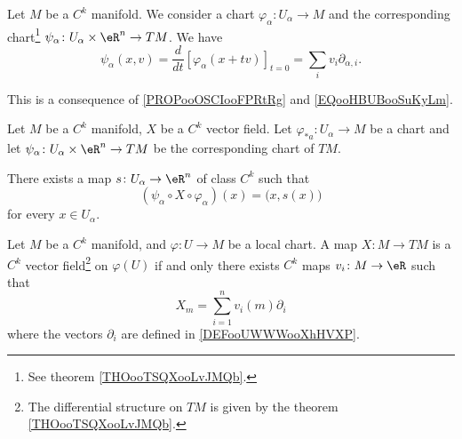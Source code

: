 \begin{proposition}	\label{PROPooMDSQooZxwwTd}
	Let \( M\) be a \( C^k\) manifold. We consider a chart \(\varphi_{\alpha} \colon U_{\alpha}\to M  \) and the corresponding chart\footnote{See theorem \ref{THOooTSQXooLvJMQb}.} \(\psi_{\alpha} \colon U_{\alpha}\times \eR^n\to TM  \). We have
	\begin{equation}
		\psi_{\alpha}(x,v)=\frac{d}{dt} \left[ \varphi_{\alpha}(x+tv)  \right]_{t=0}=\sum_iv_i\partial_{\alpha,i}.
	\end{equation}
\end{proposition}
This is a consequence of \ref{PROPooOSCIooFPRtRg} and \eqref{EQooHBUBooSuKyLm}.


\begin{proposition}	\label{PROPooZXFMooEYpudy}
	Let \( M\) be a \( C^k\) manifold, \( X\) be a \( C^k\) vector field. Let \(\varphi_{*a} \colon U_{\alpha}\to M  \) be a chart and let \(\psi_{\alpha} \colon U_{\alpha}\times \eR^n\to TM  \) be the corresponding chart of \( TM\).

	There exists a map \(s \colon U_{\alpha}\to \eR^n  \) of class \( C^k\) such that
	\begin{equation}
		(\psi_{\alpha}\circ X\circ\varphi_{\alpha})(x)=\big( x,s(x) \big)
	\end{equation}
	for every \( x\in U_{\alpha}\).
\end{proposition}


\begin{proposition}		\label{PROPooXURIooYPytwa}
	Let \( M\) be a \( C^k\) manifold, and \( \varphi\colon U\to M\) be a local chart. A map \( X\colon M\to TM\) is a \( C^k\) vector field\footnote{The differential structure on \( TM\) is given by the theorem \ref{THOooTSQXooLvJMQb}.} on \( \varphi(U)\) if and only there exists \( C^k\) maps \(v_i \colon M\to \eR  \) such that
	\begin{equation}
		X_m=\sum_{i=1}^nv_i(m)\partial_i
	\end{equation}
	where the vectors \( \partial_{i}\) are defined in \ref{DEFooUWWWooXhHVXP}.
\end{proposition}

